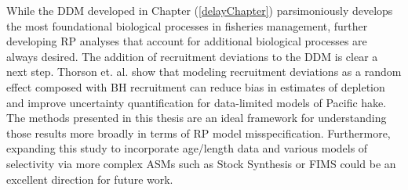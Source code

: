 \documentclass[12pt]{ucscthesis}
\begin{document}
%
While the DDM developed in Chapter (\ref{delayChapter}) parsimoniously develops 
the most foundational biological processes in fisheries management, further 
developing RP analyses that account for additional biological processes are 
always desired. The addition of recruitment deviations to the DDM is clear a next 
step. Thorson et. al. \cite{thorson_case_2019} show that modeling recruitment deviations
as a random effect composed with BH recruitment can reduce bias in estimates of depletion 
and improve uncertainty quantification for data-limited models of Pacific hake. %
The methods presented in this thesis are an ideal framework for understanding those 
results more broadly in terms of RP model misspecification. Furthermore, 
expanding this study to incorporate age/length data and various models of selectivity 
via more complex ASMs such as Stock Synthesis \cite{methot_stock_2013} or FIMS \cite{stawitz_fisheries_202}
could be an excellent direction for future work.



\end{document}

